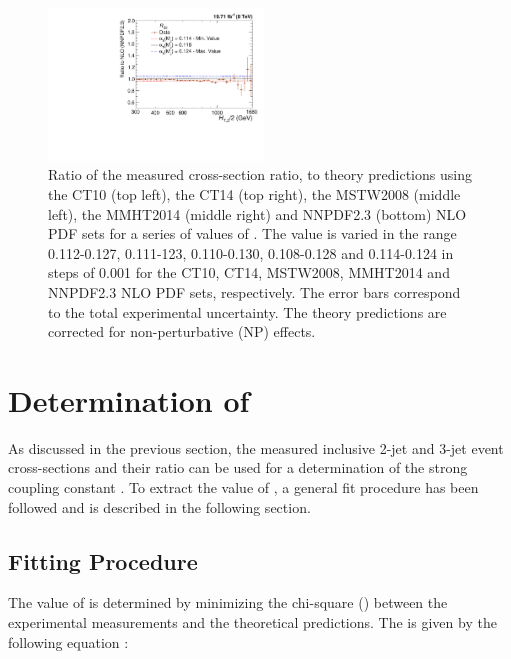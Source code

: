 \begin{figure}[!htbp]
\begin{center}
 \vspace*{3mm}
 \includegraphics[width=0.51\textwidth]{Plots_HT_2_150/Sensitivity_double_ratio_32_NNPDF23.pdf}
 \caption[Ratio of the measured cross-section ratio to theory predictions using different PDF sets.]{Ratio of the measured cross-section ratio, \ratio to theory predictions using the CT10 (top left), the CT14 (top right), the MSTW2008 (middle left), the MMHT2014 (middle right) and NNPDF2.3 (bottom) NLO PDF sets for a series of values of \alpsmz. The \alpsmz value is varied in the range 0.112-0.127, 0.111-123, 0.110-0.130, 0.108-0.128 and 0.114-0.124 in steps of 0.001 for the CT10, CT14, MSTW2008, MMHT2014 and NNPDF2.3 NLO PDF sets, respectively. The error bars correspond to the total experimental uncertainty. The theory predictions are corrected for non-perturbative (NP) effects.}
 \label{fig:sensitivity_double_ratio}
 \end{center}
\end{figure}

\section{Determination of \texorpdfstring{\alpsmz}{alpha-S(M(Z))}}

As discussed in the previous section, the measured inclusive 2-jet and 3-jet event cross-sections and their ratio \ratio can be used for a determination of the strong coupling constant \alpsmz. To extract the value of \alpsmz, a general fit procedure \cite{Chatrchyan:2013txa,Khachatryan:2014waa,Khachatryan:2016mlc} has been followed and is described in the following section. 

\subsection{Fitting Procedure}
\label{sec:Fits_procedure}
The value of \alpsmz is determined by minimizing the chi-square (\chisq) between the experimental measurements and the theoretical predictions. The \chisq is given by the following equation :

